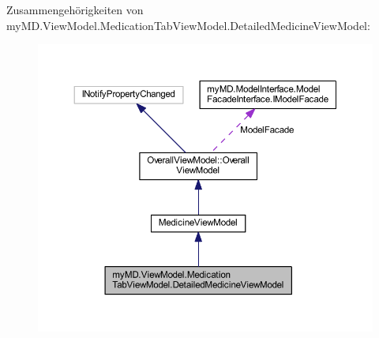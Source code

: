 Zusammengehörigkeiten von my\+M\+D.\+View\+Model.\+Medication\+Tab\+View\+Model.\+Detailed\+Medicine\+View\+Model\+:
\nopagebreak
\begin{figure}[H]
\begin{center}
\leavevmode
\includegraphics[width=350pt]{classmy_m_d_1_1_view_model_1_1_medication_tab_view_model_1_1_detailed_medicine_view_model__coll__graph}
\end{center}
\end{figure}
